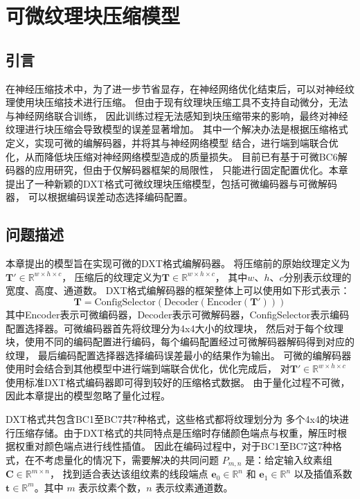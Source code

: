 
\chapter{可微纹理块压缩模型}

\section{引言}

在神经压缩技术中，为了进一步节省显存，在神经网络优化结束后，可以对神经纹理使用块压缩技术进行压缩。
但由于现有纹理块压缩工具不支持自动微分，无法与神经网络联合训练，
因此训练过程无法感知到块压缩带来的影响，最终对神经纹理进行块压缩会导致模型的误差显著增加。
其中一个解决办法是根据压缩格式定义，实现可微的编解码器，并将其与神经网络模型
结合，进行端到端联合优化，从而降低块压缩对神经网络模型造成的质量损失。
目前已有基于可微BC6解码器的应用研究，但由于仅解码器框架的局限性，
只能进行固定配置优化。本章提出了一种新颖的DXT格式可微纹理块压缩模型，包括可微编码器与可微解码器，
可以根据编码误差动态选择编码配置。

\section{问题描述}
\label{问题描述}

本章提出的模型旨在实现可微的DXT格式编解码器。
将压缩前的原始纹理定义为$\mathbf{T}'\in \mathbb{R}^{w\times h\times c}$，
压缩后的纹理定义为$\mathbf{T}\in \mathbb{R}^{w\times h\times c}$，
其中$w$、$h$、$c$分别表示纹理的宽度、高度、通道数。
DXT格式编解码器的框架整体上可以使用如下形式表示：
\begin{equation}
    \mathbf{T}=\text{ConfigSelector}(\text{Decoder}(\text{Encoder}(\mathbf{T}')))
\end{equation}
其中Encoder表示可微编码器，Decoder表示可微解码器，ConfigSelector表示编码配置选择器。可微编码器首先将纹理分为4x4大小的纹理块，
然后对于每个纹理块，使用不同的编码配置进行编码，每个编码配置经过可微解码器解码得到对应的纹理，
最后编码配置选择器选择编码误差最小的结果作为输出。
可微的编解码器使用时会结合到其他模型中进行端到端联合优化，优化完成后，
对$\mathbf{T}'\in \mathbb{R}^{w\times h\times c}$使用标准DXT格式编码器即可得到较好的压缩格式数据。
由于量化过程不可微，因此本章提出的模型忽略了量化过程。

DXT格式共包含BC1至BC7共7种格式，这些格式都将纹理划分为
多个4x4的块进行压缩存储。由于DXT格式的共同特点是压缩时存储颜色端点与权重，解压时根据权重对颜色端点进行线性插值。
因此在编码过程中，对于BC1至BC7这7种格式，在不考虑量化的情况下，需要解决的共同问题 $P_{m,n}$ 是：给定输入纹素组 $\mathbf{C}\in\mathbb{R}^{m\times n}$，
找到适合表达该组纹素的线段端点 $\mathbf{e}_0\in\mathbb{R}^n$ 和 $\mathbf{e}_1\in\mathbb{R}^n$ 
以及插值系数 $\mathbf{t}\in\mathbb{R}^m$。其中 $m$ 表示纹素个数，$n$ 表示纹素通道数。

